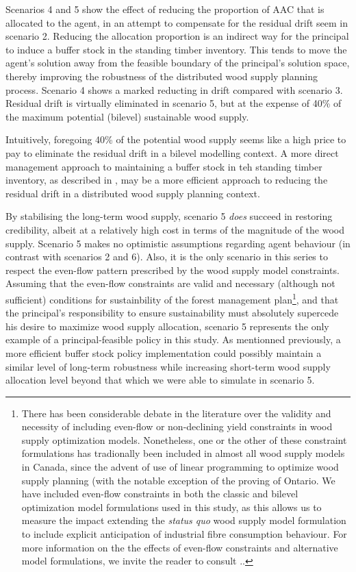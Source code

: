 Scenarios 4 and 5 show the effect of reducing the proportion of AAC that is allocated to the agent, in an attempt to compensate for the residual drift seem in scenario 2. Reducing the allocation proportion is an indirect way for the principal to induce a buffer stock in the standing timber inventory. This tends to move the agent's solution away from the feasible boundary of the principal's solution space, thereby improving the robustness of the distributed wood supply planning process. Scenario 4 shows a marked reducting in drift compared with scenario 3. Residual drift is virtually eliminated in scenario 5, but at the expense of 40\% of the maximum potential (bilevel) sustainable wood supply. 

Intuitively, foregoing 40\% of the potential wood supply seems like a high price to pay to eliminate the residual drift in a bilevel modelling context. A more direct management approach to maintaining a buffer stock in teh standing timber inventory, as described in \citet{raulier2014increasing}, may be a more efficient approach to reducing the residual drift in a distributed wood supply planning context. 

By stabilising the long-term wood supply, scenario 5 \emph{does} succeed in restoring credibility, albeit at a relatively high cost in terms of the magnitude of the wood supply. Scenario 5 makes no optimistic assumptions regarding agent behaviour (in contrast with scenarios 2 and 6). Also, it is the only scenario in this series to respect the even-flow pattern prescribed by the wood supply model constraints.  Assuming that the even-flow constraints are valid and necessary (although not sufficient) conditions for sustainbility of the forest management plan\footnote{There has been considerable debate in the literature over the validity and necessity of including even-flow or non-declining yield constraints in wood supply optimization models. Nonetheless, one or the other of these constraint formulations has tradionally been included in almost all wood supply models in Canada, since the advent of use of linear programming to optimize wood supply planning (with the notable exception of the proving of Ontario. We have included even-flow constraints in both the classic and bilevel optimization model formulations used in this study, as this allows us to measure the impact extending the \emph{status quo} wood supply model formulation to include explicit anticipation of industrial fibre consumption behaviour. For more information on the the effects of even-flow constraints and alternative model formulations, we invite the reader to consult \citet{luckert2005should}..}, and that the principal's responsibility to ensure sustainability must absolutely supercede his desire to maximize wood supply allocation, scenario 5 represents the only example of a principal-feasible policy in this study. As mentionned previously, a more efficient buffer stock policy implementation could possibly maintain a similar level of long-term robustness while increasing short-term wood supply allocation level beyond that which we were able to simulate in scenario 5.

